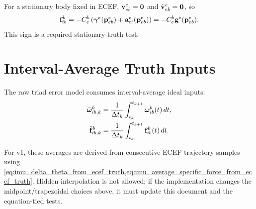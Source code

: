 For a stationary body fixed in ECEF, $\mathbf{v}_{eb}^{e}=\mathbf{0}$ and
$\dot{\mathbf{v}}_{eb}^{e}=\mathbf{0}$, so
\begin{equation}
\mathbf{f}_{ib}^{b}
=
-C_e^b
\left(
\boldsymbol{\gamma}^{e}(\mathbf{p}_{eb}^{e})
+
\mathbf{a}_{\mathrm{cf}}^{e}(\mathbf{p}_{eb}^{e})
\right)
=
-C_e^b\mathbf{g}^{e}(\mathbf{p}_{eb}^{e}).
\label{eq:imu_stationary_specific_force}
\end{equation}
This sign is a required stationary-truth test.

\section{Interval-Average Truth Inputs}

The raw triad error model consumes interval-average ideal inputs:
\begin{align}
\bar{\boldsymbol{\omega}}_{ib,k}^{b}
&=
\frac{1}{\Delta t_k}
\int_{t_k}^{t_{k+1}}
\boldsymbol{\omega}_{ib}^{b}(t)\,dt,\\
\bar{\mathbf{f}}_{ib,k}^{b}
&=
\frac{1}{\Delta t_k}
\int_{t_k}^{t_{k+1}}
\mathbf{f}_{ib}^{b}(t)\,dt.
\end{align}

For v1, these averages are derived from consecutive ECEF trajectory samples
using \cref{eq:imu_delta_theta_from_ecef_truth,eq:imu_average_specific_force_from_ecef_truth}.
Hidden interpolation is not allowed; if the implementation changes the
midpoint/trapezoidal choices above, it must update this document and the
equation-tied tests.
